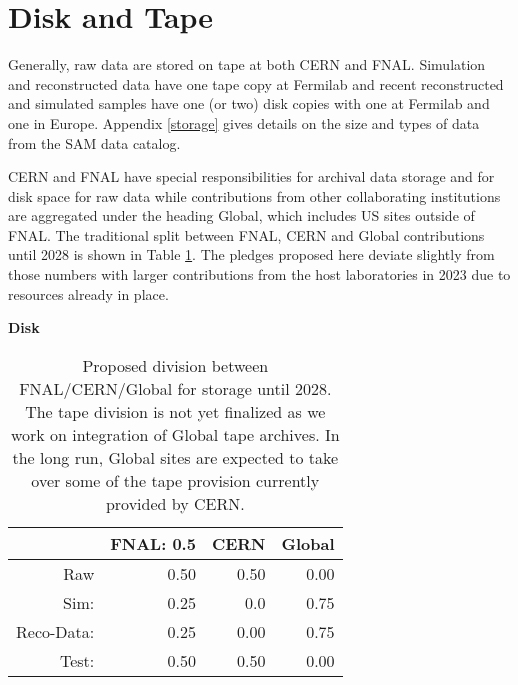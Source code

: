 \documentclass[12pt]{article}
\begin{document}
\clearpage

\section{Disk and Tape}

Generally, raw data are stored on tape at both CERN and FNAL.  Simulation and reconstructed data  have one tape copy at Fermilab and recent reconstructed and simulated samples have one (or two) disk copies with one at Fermilab and one in Europe.  Appendix \ref{storage} gives details on the size and types of data from the SAM data catalog.

CERN and FNAL have special responsibilities for archival data storage and for disk space for raw data while contributions from  other collaborating institutions are aggregated under the heading Global, which includes US sites outside of FNAL.  The traditional split between FNAL, CERN and Global contributions until 2028 is shown in Table \ref{tab:division}.  The pledges proposed here deviate slightly from those numbers with larger contributions from the host laboratories in 2023 due to resources already in place. 

\begin{table}[h]
\begin{centering}
%

   {\bf Disk}
     \begin{tabular}{|rrrr|}
     \hline
 &FNAL: 0.5&CERN & Global \\
 \hline
 Raw&   0.50&   0.50&  0.00\\ 
 Sim: & 0.25&  0.0&  0.75\\
  Reco-Data: &  0.25&   0.00&  0.75\\ 
  Test: &  0.50& 0.50&   0.00\\
  \hline
   \end{tabular}
  \caption{Proposed division between FNAL/CERN/Global for storage until 2028.  The tape division is not yet finalized as we work on integration of Global tape archives. In the long run, Global sites are expected to take over some of the tape provision currently provided by CERN. }

   \label{tab:division}
   \end{centering}
   \end{table}
\end{document}
